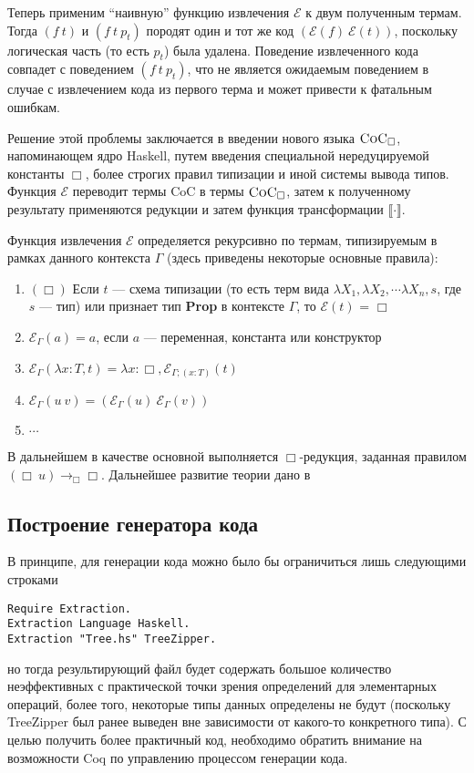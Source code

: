 Теперь применим ``наивную'' функцию извлечения $\mathcal{E}$ к двум полученным термам. Тогда $(f\ t)$ и $(f\ t\ p_t)$ породят один и тот же код $(\mathcal{E}(f)\ \mathcal{E}(t))$, поскольку логическая часть (то есть $p_t$) была удалена. Поведение извлеченного кода совпадет с поведением $(f\ t\ p_t)$, что не является ожидаемым поведением в случае с извлечением кода из первого терма и может привести к фатальным ошибкам.

Решение этой проблемы заключается в введении нового языка $\textsc{CoC}_\Box$, напоминающем ядро Haskell, путем введения специальной нередуцируемой константы $\Box$, более строгих правил типизации и иной системы вывода типов. Функция $\mathcal{E}$ переводит термы CoC в термы $\textsc{CoC}_\Box$, затем к полученному результату применяются редукции и затем функция трансформации $\llbracket \cdot \rrbracket$.

Функция извлечения $\mathcal{E}$ определяется рекурсивно по термам, типизируемым в рамках данного контекста $\Gamma$ (здесь приведены некоторые основные правила):
\begin{enumerate}
\item $(\Box)$ Если $t$ --- схема типизации (то есть терм вида $\lambda X_1, \lambda X_2, \cdots \lambda X_n, s$, где $s$ --- тип) или признает тип \textbf{Prop} в контексте $\Gamma$, то $\mathcal{E}(t)$ = $\Box$
\item $\mathcal{E}_{\Gamma}(a) = a$, если $a$ --- переменная, константа или конструктор
\item $\mathcal{E}_{\Gamma}(\lambda x:T, t) = \lambda x :\Box, \mathcal{E}_{\Gamma;(x:T)} (t)$
\item $\mathcal{E}_{\Gamma} (u\ v) = (\mathcal{E}_{\Gamma} (u)\ \mathcal{E}_{\Gamma} (v))$
\item $\cdots$
\end{enumerate}

В дальнейшем в качестве основной выполняется $\Box$-редукция, заданная правилом $(\Box\ u) \rightarrow_{\Box} \Box$. Дальнейшее развитие теории дано в~\autocite{Pierre2004}

 
\subsection{Построение генератора кода}
В принципе, для генерации кода можно было бы ограничиться лишь следующими строками
\begin{Verbatim}[fontsize=\small]
Require Extraction.
Extraction Language Haskell.
Extraction "Tree.hs" TreeZipper.
\end{Verbatim}
но тогда результирующий файл будет содержать большое количество неэффективных с практической точки зрения определений для элементарных операций, более того, некоторые типы данных определены не будут (поскольку TreeZipper был ранее выведен вне зависимости от какого-то конкретного типа). С целью получить более практичный код, необходимо обратить внимание на возможности Coq по управлению процессом генерации кода.

